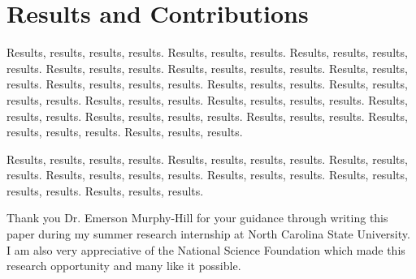 \documentclass{sigplanconf}
\begin{document}
\section{Results and Contributions}
Results, results, results, results. Results, results, results.
Results, results, results, results. Results, results, results.
Results, results, results, results. Results, results, results.
Results, results, results, results. Results, results, results.
Results, results, results, results. Results, results, results.
Results, results, results, results. Results, results, results.
Results, results, results, results. Results, results, results.
Results, results, results, results. Results, results, results.

Results, results, results, results. 
Results, results, results, results. Results, results, results.
Results, results, results, results. Results, results, results.
Results, results, results, results. Results, results, results.

\appendix
% 

\acks
Thank you Dr. Emerson Murphy-Hill for your guidance through writing this
paper during my summer research internship at North Carolina State University.
I am also very appreciative of the National Science Foundation which made this
research opportunity and many like it possible.





\softraggedright

\end{document}
